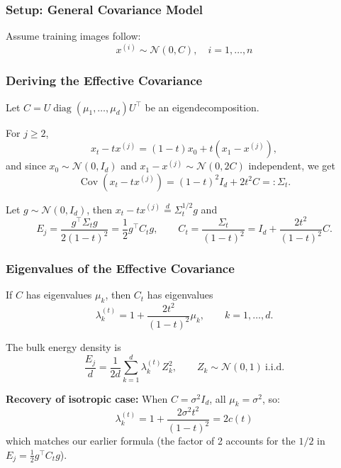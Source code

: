 \documentclass[11pt]{article}
\begin{document}
\subsubsection{Setup: General Covariance Model}
Assume training images follow:
\begin{equation}
x^{(i)} \sim \mathcal{N}(0, C), \quad i = 1, \dots, n
\end{equation}

\subsubsection{Deriving the Effective Covariance}
Let $C=U\operatorname{diag}(\mu_1,\dots,\mu_d)U^\top$ be an eigendecomposition.

For $j \ge 2$,
\begin{equation}
x_t - t x^{(j)} = (1-t)x_0 + t(x_1 - x^{(j)}),
\end{equation}
and since $x_0 \sim \mathcal{N}(0,I_d)$ and $x_1 - x^{(j)} \sim \mathcal{N}(0,2C)$ independent, we get
\begin{equation}
\operatorname{Cov}(x_t - t x^{(j)}) = (1-t)^2 I_d + 2t^2 C =: \Sigma_t.
\end{equation}

Let $g \sim \mathcal{N}(0,I_d)$, then $x_t - t x^{(j)} \overset{d}{=} \Sigma_t^{1/2} g$ and
\begin{equation}
E_j = \frac{g^\top \Sigma_t g}{2(1-t)^2} = \frac{1}{2}g^\top C_t g,
\qquad
C_t = \frac{\Sigma_t}{(1-t)^2} = I_d + \frac{2t^2}{(1-t)^2}C.
\end{equation}

\subsubsection{Eigenvalues of the Effective Covariance}
If $C$ has eigenvalues $\mu_k$, then $C_t$ has eigenvalues
\begin{equation}
\lambda_k^{(t)} = 1 + \frac{2t^2}{(1-t)^2}\mu_k, \qquad k=1,\dots,d.
\end{equation}

The bulk energy density is
\begin{equation}
\frac{E_j}{d} = \frac{1}{2d}\sum_{k=1}^d \lambda_k^{(t)} Z_k^2,
\qquad Z_k \sim \mathcal{N}(0,1) \ \text{i.i.d.}
\end{equation}

\textbf{Recovery of isotropic case:} When $C = \sigma^2 I_d$, all $\mu_k = \sigma^2$, so:
\begin{equation}
\lambda_k^{(t)} = 1 + \frac{2\sigma^2 t^2}{(1-t)^2} = 2c(t)
\end{equation}
which matches our earlier formula (the factor of 2 accounts for the $1/2$ in $E_j = \frac{1}{2}g^\top C_t g$).
\end{document}
